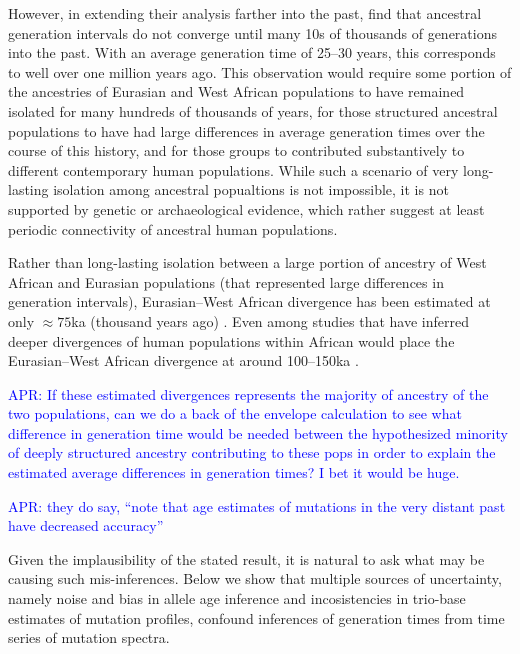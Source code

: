 \documentclass[]{article}
\newcommand{\aprcomment}[1]{{\textcolor{blue}{APR: #1}}}
\begin{document}
However, in extending their analysis farther into the past,
\citet{wang2023human} find that ancestral generation intervals do not converge
until many 10s of thousands of generations into the past. With an average
generation time of 25--30 years, this corresponds to well over one million
years ago. This observation would require some portion of the ancestries of
Eurasian and West African populations to have remained isolated for many
hundreds of thousands of years, for those structured ancestral populations to
have had large differences in average generation times over the course of this
history, and for those groups to contributed substantively to different
contemporary human populations. While such a scenario of very long-lasting
isolation among ancestral popualtions is not impossible, it is not supported by
genetic \citep{ragsdale2022weakly,others} or archaeological
\citep{scerri2018did,others} evidence, which rather suggest at least periodic
connectivity of ancestral human populations.

Rather than long-lasting isolation between a large portion of ancestry of West
African and Eurasian populations (that represented large differences in
generation intervals), Eurasian--West African divergence has been estimated at
only $\approx 75$ka (thousand years ago)
\citep[e.g.,][]{pagani2015tracing,other}. Even among studies that have inferred
deeper divergences of human populations within African would place the
Eurasian--West African divergence at around 100--150ka
\citep{schlebusch2017southern}.

\aprcomment{
    If these estimated divergences represents the majority of ancestry of the
    two populations, can we do a back of the envelope calculation to see what
    difference in generation time would be needed between the hypothesized
    minority of deeply structured ancestry contributing to these pops in order
    to explain the estimated average differences in generation times? I bet it
    would be huge.
}

\aprcomment{they do say, ``note that age estimates of mutations in the very
distant past have decreased accuracy''}

Given the implausibility of the stated result, it is natural to ask what may be
causing such mis-inferences. Below we show that multiple sources of uncertainty,
namely noise and bias in allele age inference and incosistencies in trio-base
estimates of mutation profiles, confound inferences of generation times from
time series of mutation spectra.
\end{document}
